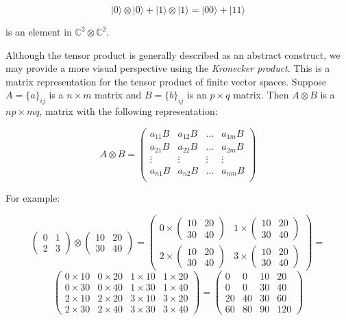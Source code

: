 $$ |0\rangle \otimes |0\rangle + |1\rangle \otimes |1\rangle = |00\rangle + |11\rangle $$

is an element in $\mathds{C}^2 \otimes \mathds{C}^2$.

Although the tensor product is generally described as an abstract construct, we may provide a more visual perspective using the \emph{Kronecker product}. This is a matrix representation for the tensor product of finite vector spaces. Suppose $A = \{a\}_{ij}$ is a $n \times m$ matrix and $B = \{b\}_{ij}$ is an $p \times q$ matrix. Then $A \otimes B$ is a $np \times mq$, matrix with the following representation:

$$ A \otimes B = 
\begin{pmatrix}
	a_{11}B & a_{12}B & \dotsc & a_{1m}B \\
	a_{21}B & a_{22}B & \dotsc & a_{2m}B \\
	\vdots & \vdots & \vdots & \vdots \\
	a_{n1}B & a_{n2}B & \dotsc & a_{nm}B \\
\end{pmatrix}
$$

For example:

$$ \begin{pmatrix}
	0 & 1 \\
	2 & 3
\end{pmatrix} \otimes
\begin{pmatrix}
	10 & 20 \\
	30 & 40
\end{pmatrix} =
\begin{pmatrix}
	0 \times \begin{pmatrix} 10 & 20 \\ 30 & 40 \end{pmatrix} &
	1 \times \begin{pmatrix} 10 & 20 \\ 30 & 40 \end{pmatrix} \\
	2 \times \begin{pmatrix} 10 & 20 \\ 30 & 40 \end{pmatrix} &
	3 \times \begin{pmatrix} 10 & 20 \\ 30 & 40 \end{pmatrix}
\end{pmatrix} = 
$$
$$ 
\begin{pmatrix}
	0 \times 10 & 0 \times 20 & 1 \times 10 & 1 \times 20 \\
	0 \times 30 & 0 \times 40 & 1 \times 30 & 1 \times 40 \\
	2 \times 10 & 2 \times 20 & 3 \times 10 & 3 \times 20 \\
	2 \times 30 & 2 \times 40 & 3 \times 30 & 3 \times 40
\end{pmatrix} = 
\begin{pmatrix}
	0 & 0 & 10 & 20 \\
	0 & 0 & 30 & 40 \\
	20 & 40 & 30 & 60 \\
	60 & 80 & 90 & 120
\end{pmatrix}
$$

